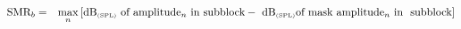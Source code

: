 \documentclass{article}
\begin{document}
 
\begin{eqnarray*}
\mbox{SMR}_b &= &\max_n \left[ \mbox{dB}_{\mbox{\tiny (SPL)}} \
   \mbox{of amplitude$_n$ in subblock} - \
   \mbox{dB}_{\mbox{\tiny (SPL)}} \mbox{of mask amplitude$_n$ in \
   subblock} \right]
\end{eqnarray*}
 \newpage 
\end{document}
